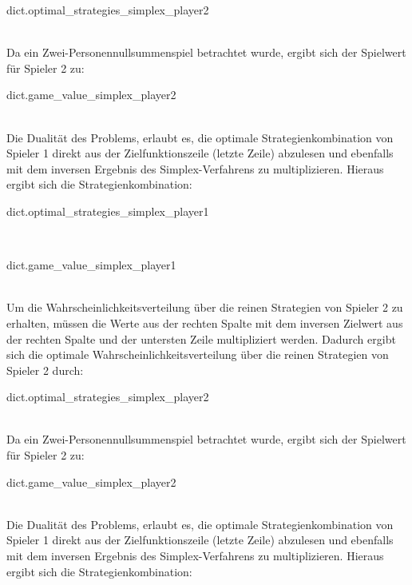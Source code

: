 \documentclass{article}
\begin{document}
{{{{{{{{\begin{center}
{{{\begin{center}{{ dict.optimal_strategies_simplex_player2 }}\end{center}\\
Da ein Zwei-Personennullsummenspiel betrachtet wurde, ergibt sich der Spielwert f\"ur Spieler 2 zu:\\
\begin{center}{{ dict.game_value_simplex_player2 }}\end{center}\\
Die Dualit\"at des Problems, erlaubt es, die optimale Strategienkombination von Spieler 1 direkt aus der Zielfunktionszeile (letzte Zeile) abzulesen und ebenfalls mit dem inversen Ergebnis des Simplex-Verfahrens zu multiplizieren. Hieraus ergibt sich die Strategienkombination:\\
\begin{center}{{ dict.optimal_strategies_simplex_player1 }}\end{center}\\
{%
\begin{center}{{ dict.game_value_simplex_player1 }}\end{center}\\
Um die Wahrscheinlichkeitsverteilung \"uber die reinen Strategien von Spieler 2 zu erhalten, m\"ussen die Werte aus der rechten Spalte mit dem inversen Zielwert aus der rechten Spalte und der untersten Zeile multipliziert werden. Dadurch ergibt sich die optimale Wahrscheinlichkeitsverteilung \"uber die reinen Strategien von Spieler 2 durch:\\
\begin{center}{{ dict.optimal_strategies_simplex_player2 }}\end{center}\\
Da ein Zwei-Personennullsummenspiel betrachtet wurde, ergibt sich der Spielwert f\"ur Spieler 2 zu:\\
\begin{center}{{ dict.game_value_simplex_player2 }}\end{center}\\
Die Dualit\"at des Problems, erlaubt es, die optimale Strategienkombination von Spieler 1 direkt aus der Zielfunktionszeile (letzte Zeile) abzulesen und ebenfalls mit dem inversen Ergebnis des Simplex-Verfahrens zu multiplizieren. Hieraus ergibt sich die Strategienkombination:\\
}}}}
\end{center}}}}}}}}}
\end{document}
